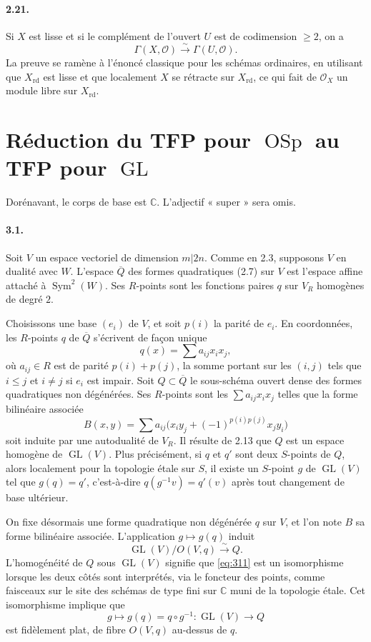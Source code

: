 \documentclass[11pt]{article}
\newcommand{\C}{\mathbb C}
\newcommand{\GL}{\operatorname{GL}}
\newcommand{\OSp}{\operatorname{OSp}}
\newcommand{\Sym}{\operatorname{Sym}}
\newcommand{\rd}{\mathrm{rd}}
\newcommand{\calO}{\mathcal O}
\newcommand{\barQ}{\overline Q}
\begin{document}
\paragraph{2.21.}
Si $X$ est lisse et si le complément de l'ouvert $U$ est de codimension $\ge2$, on a
\[
\Gamma(X,\calO)\xrightarrow{\sim}\Gamma(U,\calO).
\]
La preuve se ramène à l'énoncé classique pour les schémas ordinaires, en utilisant que $X_{\rd}$ est lisse et que localement $X$ se rétracte sur $X_{\rd}$, ce qui fait de $\calO_X$ un module libre sur $X_{\rd}$.

\section{Réduction du TFP pour $\OSp$ au TFP pour $\GL$}

Dorénavant, le corps de base est $\C$. L'adjectif « super » sera omis.

\paragraph{3.1.}
Soit $V$ un espace vectoriel de dimension $m|2n$. Comme en 2.3, supposons $V$ en dualité avec $W$. L'espace $\barQ$ des formes quadratiques (2.7) sur $V$ est l'espace affine attaché à $\Sym^2(W)$. Ses $R$-points sont les fonctions paires $q$ sur $V_R$ homogènes de degré $2$.

Choisissons une base $(e_i)$ de $V$, et soit $p(i)$ la parité de $e_i$. En coordonnées, les $R$-points $q$ de $\barQ$ s'écrivent de façon unique
\[
q(x)=\sum a_{ij}x_i x_j,
\]
où $a_{ij}\in R$ est de parité $p(i)+p(j)$, la somme portant sur les $(i,j)$ tels que $i\le j$ et $i\ne j$ si $e_i$ est impair. Soit $Q\subset\barQ$ le sous-schéma ouvert dense des formes quadratiques non dégénérées. Ses $R$-points sont les $\sum a_{ij}x_ix_j$ telles que la forme bilinéaire associée
\[
B(x,y)=\sum a_{ij}\bigl(x_i y_j+(-1)^{p(i)p(j)}x_j y_i\bigr)
\]
soit induite par une autodualité de $V_R$. Il résulte de 2.13 que $Q$ est un espace homogène de $\GL(V)$. Plus précisément, si $q$ et $q'$ sont deux $S$-points de $Q$, alors localement pour la topologie étale sur $S$, il existe un $S$-point $g$ de $\GL(V)$ tel que $g(q)=q'$, c'est-à-dire $q(g^{-1}v)=q'(v)$ après tout changement de base ultérieur.

On fixe désormais une forme quadratique non dégénérée $q$ sur $V$, et l'on note $B$ sa forme bilinéaire associée. L'application $g\mapsto g(q)$ induit
\begin{equation}
\label{eq:311}
\GL(V)/O(V,q)\xrightarrow{\sim}Q.
\end{equation}
L'homogénéité de $Q$ sous $\GL(V)$ signifie que \eqref{eq:311} est un isomorphisme lorsque les deux côtés sont interprétés, via le foncteur des points, comme faisceaux sur le site des schémas de type fini sur $\C$ muni de la topologie étale. Cet isomorphisme implique que
\[
g\longmapsto g(q)=q\circ g^{-1}:\GL(V)\longrightarrow Q
\]
est fidèlement plat, de fibre $O(V,q)$ au-dessus de $q$.
\end{document}
